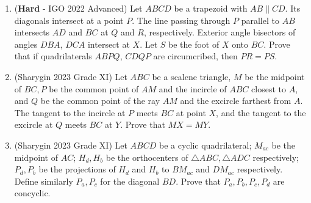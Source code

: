 \documentclass[12pt]{scrartcl}
\begin{document}
\begin{enumerate}
    \item (\textbf{Hard} - IGO 2022 Advanced) Let $ABCD$ be a trapezoid with $AB\parallel CD$. Its diagonals intersect at a point $P$. The line passing through $P$ parallel to $AB$ intersects $AD$ and $BC$ at $Q$ and $R$, respectively. Exterior angle bisectors of angles $DBA$, $DCA$ intersect at $X$. Let $S$ be the foot of $X$ onto $BC$. Prove that if quadrilaterals $ABPQ$, $CDQP$ are circumcribed, then $PR=PS$.

    \item (Sharygin 2023 Grade XI) Let $ABC$ be a scalene triangle, $M$ be the midpoint of $BC,P$ be the common point of $AM$ and the incircle of $ABC$ closest to $A$, and $Q$ be the common point of the ray $AM$ and the excircle farthest from $A$. The tangent to the incircle at $P$ meets $BC$ at point $X$, and the tangent to the excircle at $Q$ meets $BC$ at $Y$. Prove that $MX=MY$.

    \item (Sharygin 2023 Grade XI) Let $ABCD$ be a cyclic quadrilateral; $M_{ac}$ be the midpoint of $AC$; $H_d,H_b$ be the orthocenters of $\triangle ABC,\triangle ADC$ respectively; $P_d,P_b$ be the projections of $H_d$ and $H_b$ to $BM_{ac}$ and $DM_{ac}$ respectively. Define similarly $P_a,P_c$ for the diagonal $BD$. Prove that $P_a,P_b,P_c,P_d$ are concyclic.

\end{enumerate}
\end{document}
